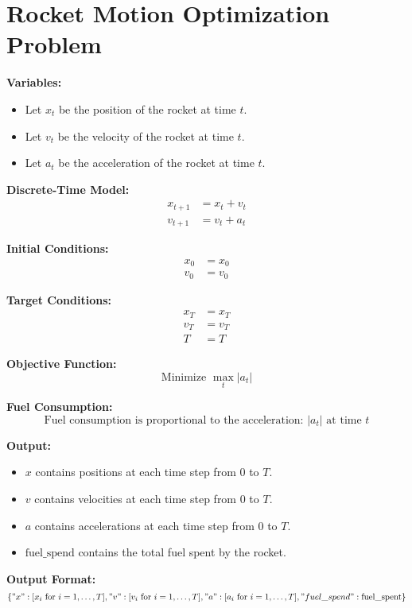 \documentclass{article}
\begin{document}
\section*{Rocket Motion Optimization Problem}

\textbf{Variables:}
\begin{itemize}
    \item Let \( x_t \) be the position of the rocket at time \( t \).
    \item Let \( v_t \) be the velocity of the rocket at time \( t \).
    \item Let \( a_t \) be the acceleration of the rocket at time \( t \).
\end{itemize}

\textbf{Discrete-Time Model:}
\begin{align*}
    x_{t+1} &= x_t + v_t \\
    v_{t+1} &= v_t + a_t
\end{align*}

\textbf{Initial Conditions:}
\begin{align*}
    x_0 &= x_0 \\
    v_0 &= v_0
\end{align*}

\textbf{Target Conditions:}
\begin{align*}
    x_T &= x_T \\
    v_T &= v_T \\
    T &= T
\end{align*}

\textbf{Objective Function:}
\[
\text{Minimize } \max_{t} |a_t|
\]

\textbf{Fuel Consumption:}
\[
\text{Fuel consumption is proportional to the acceleration: } |a_t| \text{ at time } t
\]

\textbf{Output:}
\begin{itemize}
    \item \( x \) contains positions at each time step from \( 0 \) to \( T \).
    \item \( v \) contains velocities at each time step from \( 0 \) to \( T \).
    \item \( a \) contains accelerations at each time step from \( 0 \) to \( T \).
    \item \( \text{fuel\_spend} \) contains the total fuel spent by the rocket.
\end{itemize}

\textbf{Output Format:}
\[
\{ 
    "x": [x_i \text{ for } i = 1, \ldots, T], \\
    "v": [v_i \text{ for } i = 1, \ldots, T], \\
    "a": [a_i \text{ for } i = 1, \ldots, T], \\
    "fuel\_spend": \text{fuel\_spent}
\}
\]
\end{document}
